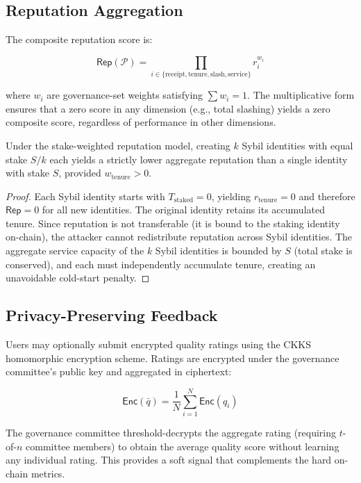 \subsection{Reputation Aggregation}

The composite reputation score is:

\begin{equation}\label{eq:reputation}
    \mathsf{Rep}(\mathcal{P}) = \prod_{i \in \{\text{receipt}, \text{tenure}, \text{slash}, \text{service}\}} r_i^{w_i}
\end{equation}

where $w_i$ are governance-set weights satisfying $\sum w_i = 1$. The
multiplicative form ensures that a zero score in any dimension (e.g.,
total slashing) yields a zero composite score, regardless of performance
in other dimensions.

\begin{theorem}
Under the stake-weighted reputation model, creating $k$ Sybil identities
with equal stake $S/k$ each yields a strictly lower aggregate reputation
than a single identity with stake $S$, provided $w_{\text{tenure}} > 0$.
\end{theorem}

\begin{proof}
Each Sybil identity starts with $T_{\text{staked}} = 0$, yielding
$r_{\text{tenure}} = 0$ and therefore $\mathsf{Rep} = 0$ for all new
identities. The original identity retains its accumulated tenure. Since
reputation is not transferable (it is bound to the staking identity on-chain),
the attacker cannot redistribute reputation across Sybil identities. The
aggregate service capacity of the $k$ Sybil identities is bounded by $S$
(total stake is conserved), and each must independently accumulate tenure,
creating an unavoidable cold-start penalty.
\end{proof}

\subsection{Privacy-Preserving Feedback}

Users may optionally submit encrypted quality ratings using the CKKS
homomorphic encryption scheme. Ratings are encrypted under the governance
committee's public key and aggregated in ciphertext:

\begin{equation}
    \mathsf{Enc}(\bar{q}) = \frac{1}{N} \sum_{i=1}^{N} \mathsf{Enc}(q_i)
\end{equation}

The governance committee threshold-decrypts the aggregate rating (requiring
$t$-of-$n$ committee members) to obtain the average quality score without
learning any individual rating. This provides a soft signal that complements
the hard on-chain metrics.

